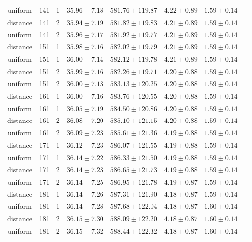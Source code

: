 \begin{tabular}{cccrrrrr}
uniform & 141 & 1 & $35.96 \pm 7.18$ & $581.76 \pm 119.87$ & $4.22 \pm 0.89$ & $1.59 \pm 0.14$\\
distance & 141 & 2 & $35.94 \pm 7.19$ & $581.82 \pm 119.83$ & $4.21 \pm 0.89$ & $1.59 \pm 0.14$\\
uniform & 141 & 2 & $35.96 \pm 7.17$ & $581.92 \pm 119.77$ & $4.21 \pm 0.89$ & $1.59 \pm 0.14$\\
distance & 151 & 1 & $35.98 \pm 7.16$ & $582.02 \pm 119.79$ & $4.21 \pm 0.89$ & $1.59 \pm 0.14$\\
uniform & 151 & 1 & $36.00 \pm 7.14$ & $582.12 \pm 119.78$ & $4.21 \pm 0.89$ & $1.59 \pm 0.14$\\
distance & 151 & 2 & $35.99 \pm 7.16$ & $582.26 \pm 119.71$ & $4.20 \pm 0.88$ & $1.59 \pm 0.14$\\
uniform & 151 & 2 & $36.00 \pm 7.13$ & $583.13 \pm 120.25$ & $4.20 \pm 0.88$ & $1.59 \pm 0.14$\\
distance & 161 & 1 & $36.00 \pm 7.16$ & $583.76 \pm 120.55$ & $4.20 \pm 0.88$ & $1.59 \pm 0.14$\\
uniform & 161 & 1 & $36.05 \pm 7.19$ & $584.50 \pm 120.86$ & $4.20 \pm 0.88$ & $1.59 \pm 0.14$\\
distance & 161 & 2 & $36.08 \pm 7.20$ & $585.10 \pm 121.15$ & $4.20 \pm 0.88$ & $1.59 \pm 0.14$\\
uniform & 161 & 2 & $36.09 \pm 7.23$ & $585.61 \pm 121.36$ & $4.19 \pm 0.88$ & $1.59 \pm 0.14$\\
distance & 171 & 1 & $36.12 \pm 7.23$ & $586.07 \pm 121.55$ & $4.19 \pm 0.88$ & $1.59 \pm 0.14$\\
uniform & 171 & 1 & $36.14 \pm 7.22$ & $586.33 \pm 121.60$ & $4.19 \pm 0.88$ & $1.59 \pm 0.14$\\
distance & 171 & 2 & $36.14 \pm 7.23$ & $586.65 \pm 121.73$ & $4.19 \pm 0.88$ & $1.59 \pm 0.14$\\
uniform & 171 & 2 & $36.14 \pm 7.25$ & $586.95 \pm 121.78$ & $4.19 \pm 0.87$ & $1.59 \pm 0.14$\\
distance & 181 & 1 & $36.14 \pm 7.26$ & $587.31 \pm 121.90$ & $4.18 \pm 0.87$ & $1.59 \pm 0.14$\\
uniform & 181 & 1 & $36.14 \pm 7.28$ & $587.68 \pm 122.04$ & $4.18 \pm 0.87$ & $1.60 \pm 0.14$\\
distance & 181 & 2 & $36.15 \pm 7.30$ & $588.09 \pm 122.20$ & $4.18 \pm 0.87$ & $1.60 \pm 0.14$\\
uniform & 181 & 2 & $36.15 \pm 7.32$ & $588.44 \pm 122.32$ & $4.18 \pm 0.87$ & $1.60 \pm 0.14$\\

\end{tabular}
